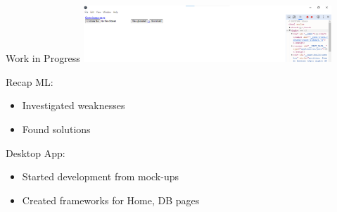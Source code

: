 \begin{frame}{Work in Progress}
    \centering
    \includegraphics[height=0.7\textheight,width=0.7\textwidth,keepaspectratio]{images/label.png} 
\end{frame}

\begin{frame}{Recap}
    ML:
    \begin{itemize}
        \item Investigated weaknesses
        \item Found solutions
    \end{itemize}
    Desktop App:
    \begin{itemize}
        \item Started development from mock-ups
        \item Created frameworks for Home, DB pages
    \end{itemize}
\end{frame}